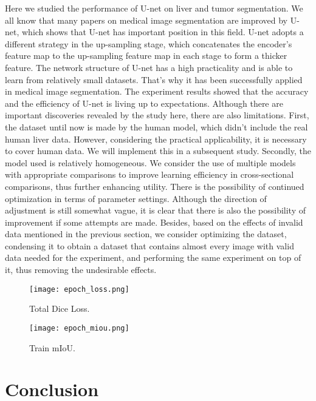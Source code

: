\documentclass[a4paper]{article}
\begin{document}
Here we studied the performance of U-net on liver and tumor segmentation. We all know that many papers on medical image segmentation are improved by U-net, which shows that U-net has important position in this field. U-net adopts a different strategy in the up-sampling stage, which concatenates the encoder's feature map to the up-sampling feature map in each stage to form a thicker feature. The network structure of U-net has a high practicality and is able to learn from relatively small datasets. That's why it has been successfully applied in medical image segmentation. 
The experiment results showed that the accuracy and the efficiency of U-net is living up to expectations.
Although there are important discoveries revealed by the study here, there are also limitations. First, the dataset until now is made by the human model, which didn't include the real human liver data. However, considering the practical applicability, it is necessary to cover human data. We will implement this in a subsequent study. Secondly, the model used is relatively homogeneous. We consider the use of multiple models with appropriate comparisons to improve learning efficiency in cross-sectional comparisons, thus further enhancing utility. There is the possibility of continued optimization in terms of parameter settings. Although the direction of adjustment is still somewhat vague, it is clear that there is also the possibility of improvement if some attempts are made. Besides, based on the effects of invalid data mentioned in the previous section, we consider optimizing the dataset, condensing it to obtain a dataset that contains almost every image with valid data needed for the experiment, and performing the same experiment on top of it, thus removing the undesirable effects.

\begin{figure}
	\centering
	\texttt{[image: epoch\_loss.png]}
	\vspace*{-4mm}
	\caption{Total Dice Loss.}
	\label{fig: fig1}
\end{figure}

\begin{figure}
	\centering
	\texttt{[image: epoch\_miou.png]}
	\vspace*{-4mm}
	\caption{Train mIoU.}
	\label{fig: fig1}
\end{figure}


\section{Conclusion}
\end{document}
